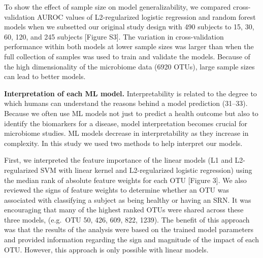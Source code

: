 \documentclass[11pt,]{article}
\begin{document}
To show the effect of sample size on model generalizability, we compared
cross-validation AUROC values of L2-regularized logistic regression and
random forest models when we subsetted our original study design with
490 subjects to 15, 30, 60, 120, and 245 subjects {[}Figure S3{]}. The
variation in cross-validation performance within both models at lower
sample sizes was larger than when the full collection of samples was
used to train and validate the models. Because of the high
dimensionality of the microbiome data (6920 OTUs), large sample sizes
can lead to better models.

\textbf{Interpretation of each ML model.} Interpretability is related to
the degree to which humans can understand the reasons behind a model
prediction (31--33). Because we often use ML models not just to predict
a health outcome but also to identify the biomarkers for a disease,
model interpretation becomes crucial for microbiome studies. ML models
decrease in interpretability as they increase in complexity. In this
study we used two methods to help interpret our models.

First, we interpreted the feature importance of the linear models (L1
and L2-regularized SVM with linear kernel and L2-regularized logistic
regression) using the median rank of absolute feature weights for each
OTU {[}Figure 3{]}. We also reviewed the signs of feature weights to
determine whether an OTU was associated with classifying a subject as
being healthy or having an SRN. It was encouraging that many of the
highest ranked OTUs were shared across these three models, (e.g.~OTU 50,
426, 609, 822, 1239). The benefit of this approach was that the results
of the analysis were based on the trained model parameters and provided
information regarding the sign and magnitude of the impact of each OTU.
However, this approach is only possible with linear models.
\end{document}
